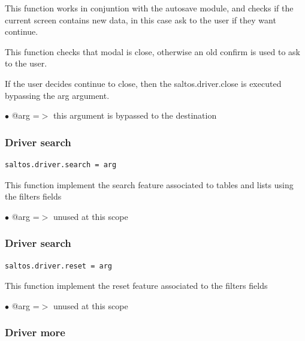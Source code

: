 \documentclass[a4paper]{article}
\begin{document}
This function works in conjuntion with the autosave module, and checks if the
current screen contains new data, in this case ask to the user if they want
continue.

This function checks that modal is close, otherwise an old confirm is used
to ask to the user.

If the user decides continue to close, then the saltos.driver.close is executed
bypassing the arg argument.

\begin{compactitem}
\item[\color{myblue}$\bullet$] @arg =$>$ this argument is bypassed to the destination
\end{compactitem}

\hypertarget{toc171}{}
\subsubsection{Driver search}

\begin{lstlisting}
saltos.driver.search = arg
\end{lstlisting}

This function implement the search feature associated to tables and lists
using the filters fields

\begin{compactitem}
\item[\color{myblue}$\bullet$] @arg =$>$ unused at this scope
\end{compactitem}

\hypertarget{toc172}{}
\subsubsection{Driver search}

\begin{lstlisting}
saltos.driver.reset = arg
\end{lstlisting}

This function implement the reset feature associated to the filters fields

\begin{compactitem}
\item[\color{myblue}$\bullet$] @arg =$>$ unused at this scope
\end{compactitem}

\hypertarget{toc173}{}
\subsubsection{Driver more}
\end{document}
